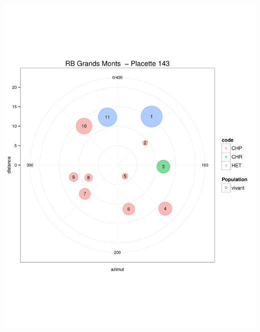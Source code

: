 \documentclass[a4paper]{book}\usepackage[]{graphicx}\usepackage[]{color}
\makeatletter
\def\maxwidth{ %
  \ifdim\Gin@nat@width>\linewidth
    \linewidth
  \else
    \Gin@nat@width
  \fi
}
\newenvironment{knitrout}{}{} %
\makeatother
\begin{document}
\begin{knitrout}
{\centering \includegraphics[width=\maxwidth]{Figures/PlanArbres-11} 

}





\end{knitrout}
\end{document}
